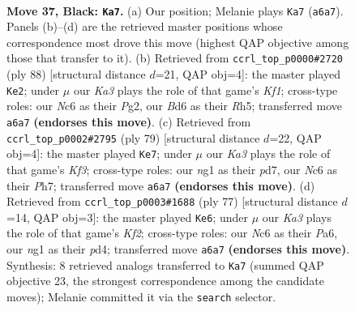 \documentclass[11pt]{article}
\begin{document}
\clearpage

\begin{figure}[p]\centering
\begin{subfigure}{0.46\textwidth}\centering
\resizebox{\linewidth}{!}{%
\newchessgame
\chessboard[
  setfen={8/8/k1nb2p1/6P1/p1b4B/8/8/4K1N1 b - - 9 37},
  showmover=false,
  pgfstyle=straightmove, color=movearrow, markmove={a6-a7}
]}
\caption{}
\end{subfigure}\hfill
\begin{subfigure}{0.46\textwidth}\centering
\resizebox{\linewidth}{!}{%
\newchessgame
\chessboard[
  setfen={8/6k1/2r5/7R/p7/3B4/1b4P1/5K2 w - - 2 45},
  showmover=false,
  pgfstyle=straightmove, color=movearrow, markmove={f1-e2}
]}
\caption{}
\end{subfigure}
\\[4pt]
\begin{subfigure}{0.46\textwidth}\centering
\resizebox{\linewidth}{!}{%
\newchessgame
\chessboard[
  setfen={3b4/3P3p/2K2k2/8/2B2p2/5P2/7P/8 b - - 2 40},
  showmover=false,
  pgfstyle=straightmove, color=movearrow, markmove={f6-e7}
]}
\caption{}
\end{subfigure}\hfill
\begin{subfigure}{0.46\textwidth}\centering
\resizebox{\linewidth}{!}{%
\newchessgame
\chessboard[
  setfen={8/5k2/p7/8/p2P1B2/P7/b7/2K5 b - - 0 39},
  showmover=false,
  pgfstyle=straightmove, color=movearrow, markmove={f7-e6}
]}
\caption{}
\end{subfigure}
\caption{\textbf{Move 37, Black: \texttt{Ka7}.} (a) Our position; Melanie plays \texttt{Ka7} (\texttt{a6a7}). Panels (b)--(d) are the retrieved master positions whose correspondence most drove this move (highest QAP objective among those that transfer to it). (b) Retrieved from \texttt{ccrl\_top\_p0000\#2720} (ply 88) [structural distance $d$=21, QAP obj=4]: the master played \texttt{Ke2}; under $\mu$ our \emph{Ka3} plays the role of that game's \emph{Kf1}; cross-type roles: our \emph{N}c6 as their \emph{P}g2, our \emph{B}d6 as their \emph{R}h5; transferred move \texttt{a6a7} \textbf{(endorses this move)}. (c) Retrieved from \texttt{ccrl\_top\_p0002\#2795} (ply 79) [structural distance $d$=22, QAP obj=4]: the master played \texttt{Ke7}; under $\mu$ our \emph{Ka3} plays the role of that game's \emph{Kf3}; cross-type roles: our \emph{n}g1 as their \emph{p}d7, our \emph{N}c6 as their \emph{P}h7; transferred move \texttt{a6a7} \textbf{(endorses this move)}. (d) Retrieved from \texttt{ccrl\_top\_p0003\#1688} (ply 77) [structural distance $d$=14, QAP obj=3]: the master played \texttt{Ke6}; under $\mu$ our \emph{Ka3} plays the role of that game's \emph{Kf2}; cross-type roles: our \emph{N}c6 as their \emph{P}a6, our \emph{n}g1 as their \emph{p}d4; transferred move \texttt{a6a7} \textbf{(endorses this move)}. Synthesis: 8 retrieved analogs transferred to \texttt{Ka7} (summed QAP objective 23, the strongest correspondence among the candidate moves); Melanie committed it via the \texttt{search} selector.}
\label{fig:thought-m73}
\end{figure}
\end{document}
